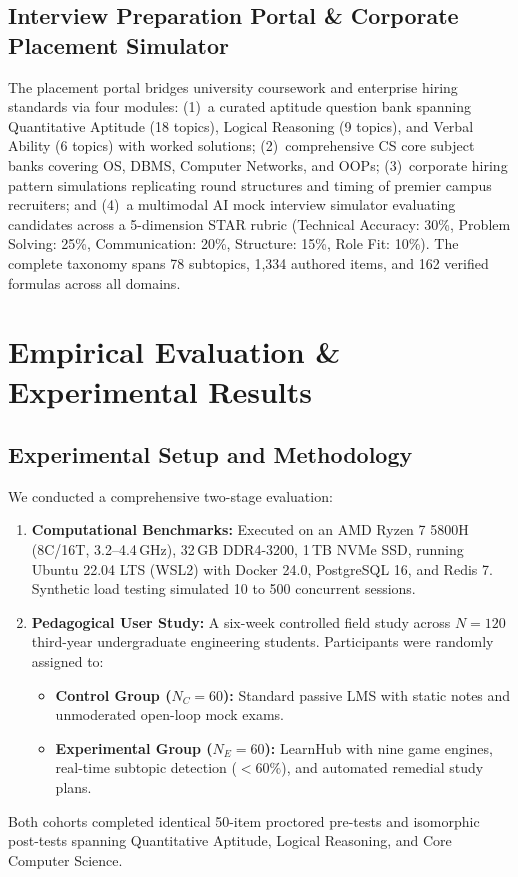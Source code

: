 \documentclass[journal]{IEEEtran}
\begin{document}
\subsection{Interview Preparation Portal \& Corporate Placement Simulator}
The placement portal bridges university coursework and enterprise hiring standards via four modules: (1)~a curated aptitude question bank spanning Quantitative Aptitude (18 topics), Logical Reasoning (9 topics), and Verbal Ability (6 topics) with worked solutions; (2)~comprehensive CS core subject banks covering OS, DBMS, Computer Networks, and OOPs; (3)~corporate hiring pattern simulations replicating round structures and timing of premier campus recruiters; and (4)~a multimodal AI mock interview simulator evaluating candidates across a 5-dimension STAR rubric (Technical Accuracy: 30\%, Problem Solving: 25\%, Communication: 20\%, Structure: 15\%, Role Fit: 10\%). The complete taxonomy spans 78 subtopics, 1,334 authored items, and 162 verified formulas across all domains.

\section{Empirical Evaluation \& Experimental Results}
\label{sec:evaluation}
\subsection{Experimental Setup and Methodology}
We conducted a comprehensive two-stage evaluation:
\begin{enumerate}
\item \textbf{Computational Benchmarks:} Executed on an AMD Ryzen 7 5800H (8C/16T, 3.2--4.4\,GHz), 32\,GB DDR4-3200, 1\,TB NVMe SSD, running Ubuntu 22.04 LTS (WSL2) with Docker 24.0, PostgreSQL 16, and Redis 7. Synthetic load testing simulated 10 to 500 concurrent sessions.
\item \textbf{Pedagogical User Study:} A six-week controlled field study across $N = 120$ third-year undergraduate engineering students. Participants were randomly assigned to:
\begin{itemize}
\item \textbf{Control Group ($N_C = 60$):} Standard passive LMS with static notes and unmoderated open-loop mock exams.
\item \textbf{Experimental Group ($N_E = 60$):} LearnHub with nine game engines, real-time subtopic detection ($<60\%$), and automated remedial study plans.
\end{itemize}
\end{enumerate}
Both cohorts completed identical 50-item proctored pre-tests and isomorphic post-tests spanning Quantitative Aptitude, Logical Reasoning, and Core Computer Science.
\end{document}
